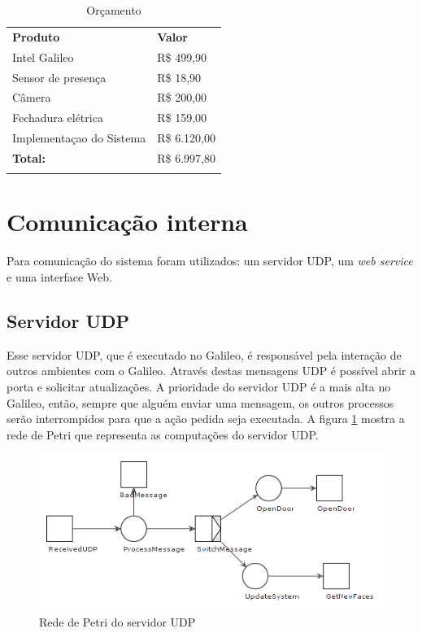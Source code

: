 \documentclass[12pt]{article}
\begin{document}
	\begin{table}[]
	\centering
	\caption{Orçamento}
	\label{orcamento}
	\begin{tabular}{ll}
	\textbf{Produto}         & \textbf{Valor} \\
	Intel Galileo            & R\$ 499,90     \\
	Sensor de presença       & R\$ 18,90      \\
	Câmera                   & R\$ 200,00     \\
	Fechadura elétrica       & R\$ 159,00     \\
	Implementaçao do Sistema & R\$ 6.120,00   \\
	\textbf{Total:}          & R\$ 6.997,80   \\
                         &               
	\end{tabular}
	\end{table}	
	
	
	
	
	

\section{Comunicação interna}
    Para comunicação do sistema foram utilizados: um servidor UDP, um
    \textit{web service} e uma interface Web.
\subsection{Servidor UDP}
    Esse servidor UDP, que é executado no Galileo, é responsável pela interação
    de outros ambientes com o Galileo. Através destas mensagens UDP é possível
    abrir a porta e solicitar atualizações.
    A prioridade do servidor UDP é a mais alta no Galileo, então, sempre que
    alguém enviar uma mensagem, os outros processos serão interrompidos para que
    a ação pedida seja executada. A figura \ref{fig:petri-udp} mostra a rede de
    Petri que representa as computações do servidor UDP.
    
    \begin{figure}[ht]
		\centering
		\includegraphics[width=.7\textwidth]{petri-udp.png}
		\caption{Rede de Petri do servidor UDP}
		\label{fig:petri-udp}
	\end{figure}
	
\end{document}

